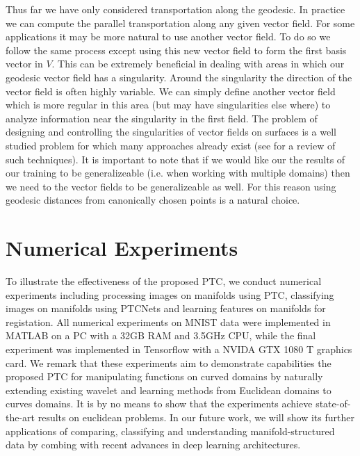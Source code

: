 \documentclass[10pt,twocolumn,letterpaper]{article}
\begin{document}


Thus far we have only considered transportation along the geodesic. In practice we can compute the parallel transportation along any given vector field. For some applications it may be more natural to use another vector field. To do so we follow the same process except using this new vector field to form the first basis vector in $V$. This can be extremely beneficial in dealing with areas in which our geodesic vector field has a singularity. Around the singularity the direction of the vector field is often highly variable. We can simply define another vector field which is more regular in this area (but may have singularities else where) to analyze information near the singularity in the first field. The problem of designing and controlling the singularities of vector fields on surfaces is a well studied problem for which many approaches already exist (see \cite{DeGoe2015vector} for a review of such techniques). It is important to note that if we would like our the results of our training to be generalizeable (i.e. when working with multiple domains) then we need to the vector fields to be generalizeable as well. For this reason using geodesic distances from canonically chosen points is a natural choice.


\section{Numerical Experiments}
\label{sec:experiments}
To illustrate the effectiveness of the proposed PTC,  we conduct numerical experiments including processing images on manifolds using PTC, classifying images on manifolds using PTCNets and learning features on manifolds for registation. All numerical experiments on MNIST data were implemented in MATLAB on a PC with a 32GB RAM and 3.5GHz CPU, while the final experiment was implemented in Tensorflow with a NVIDA GTX 1080 T graphics card.
We remark that these experiments aim to demonstrate capabilities the proposed PTC for manipulating functions on curved domains by naturally extending existing wavelet and learning methods from Euclidean domains to curves domains. It is by no means to show that the experiments achieve state-of-the-art results on euclidean problems. In our future work, we will show its further applications of comparing, classifying and understanding manifold-structured data by combing with recent advances in deep learning architectures.
\end{document}
